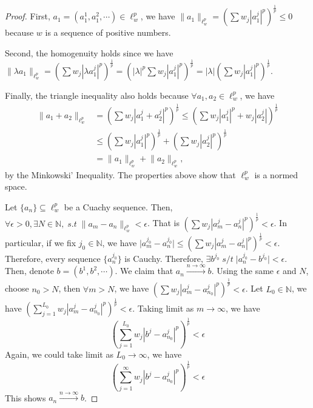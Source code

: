 \begin{answer}
    \begin{proof}
        First, $a_1 = (a_1^1,a_1^2,\cdots) \in \ell_w^p$, we have $\lVert a_1 \rVert_{\ell_w^p} = \left(\sum w_j\left|a_1^j\right|^p\right)^{\frac{1}{p}} \leq 0$ because $w$ is a sequence of positive numbers.
        
        Second, the homogenuity holds since we have $\lVert \lambda a_1 \rVert_{\ell_w^p} = \left(\sum w_j\left|\lambda a_1^j\right|^p\right)^{\frac{1}{p}} = \left(\lvert \lambda \rvert^p \sum w_j\left|a_1^j\right|^p\right)^{\frac{1}{p}} = \lvert \lambda \rvert \left(\sum w_j\left|a_1^j\right|^p\right)^{\frac{1}{p}}$.
        
        Finally, the triangle inequality also holds because $\forall a_1,a_2\in \ell_w^p$, we have 
        \begin{equation}
            \begin{aligned}
                \lVert a_1+a_2 \rVert_{\ell_w^p} &= \left(\sum w_j\left|a_1^j+a_2^j\right|^p\right)^{\frac{1}{p}} \leq \left(\sum w_j\left|a_1^j\right|^p + w_j\left|a_2^j\right|\right)^{\frac{1}{p}}\\
                &\leq \left(\sum w_j\left|a_1^j\right|^p\right)^{\frac{1}{p}} + \left(\sum w_j\left|a_2^j\right|^p\right)^{\frac{1}{p}}\\
                &= \lVert a_1 \rVert_{\ell_w^p} + \lVert a_2 \rVert_{\ell_w^p},
            \end{aligned}
        \end{equation}
        by the Minkowski' Inequality. The properties above show that $\ell_w^p$ is a normed space.
        
        Let $\{a_n\} \subseteq \ell_w^p$ be a Cuachy sequence. Then, $\forall \epsilon > 0, \exists N \in \mathbb{N},\; s.t\; \lVert a_m - a_n \rVert_{\ell_w^p} < \epsilon$. That is $\left(\sum w_j\left|a_m^j-a_n^j\right|^p\right)^{\frac{1}{p}} < \epsilon$. In particular, if we fix $j_0 \in \mathbb{N}$, we have $\lvert a_m^{j_0} - a_n^{j_0} \rvert \leq \left(\sum w_j\left|a_m^j-a_n^j\right|^p\right)^{\frac{1}{p}} < \epsilon$. Therefore, every sequence $\{a_n^{j_0}\}$ is Cauchy. Therefore, $\exists b^{j_0}\; s/t \; \lvert a_n^{j_0} - b^{j_0}\rvert < \epsilon$. Then, denote $b = (b^1,b^2,\cdots)$. We claim that $a_n \xrightarrow{n \to \infty} b$. Using the same $\epsilon$ and $N$, choose $n_0 > N$, then $\forall m > N$, we have $\left(\sum w_j\left|a_m^j-a_{n_0}^j\right|^p\right)^{\frac{1}{p}} < \epsilon$. Let $L_0 \in \mathbb{N}$, we have $\left(\sum_{j=1}^{L_0} w_j\left|a_m^j-a_{n_0}^j\right|^p\right)^{\frac{1}{p}} < \epsilon$. Taking limit as $m \to \infty$, we have
        \begin{equation}
            \left(\sum_{j=1}^{L_0} w_j\left|b^j-a_{n_0}^j\right|^p\right)^{\frac{1}{p}} < \epsilon
        \end{equation}
        Again, we could take limit as $L_0 \to \infty$, we have
        \begin{equation}
            \left(\sum_{j=1}^{\infty} w_j\left|b^j-a_{n_0}^j\right|^p\right)^{\frac{1}{p}} < \epsilon
        \end{equation}
        This shows $a_n \xrightarrow{n \to \infty} b$.
        

\end{proof}
\end{answer}
